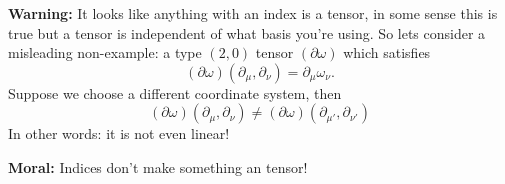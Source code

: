 \medbreak\noindent\textbf{Warning:\quad}\ignorespaces %
It looks like anything with an index is a tensor, in some sense
this is true but a tensor is independent of what basis you're using.
So lets consider a misleading non-example: a type $(2,0)$ tensor
$(\partial\omega)$ which satisfies
\begin{equation}
(\partial\omega)(\partial_{\mu},\partial_{\nu})=\partial_{\mu}\omega_{\nu}.
\end{equation}
Suppose we choose a different coordinate system, then
\begin{equation}
(\partial\omega)(\partial_{\mu},\partial_{\nu})\not=
(\partial\omega)(\partial_{\mu'},\partial_{\nu'})
\end{equation}
In other words: it is not even linear!

\noindent\textbf{Moral:\quad}\ignorespaces %
Indices don't make something an tensor!

